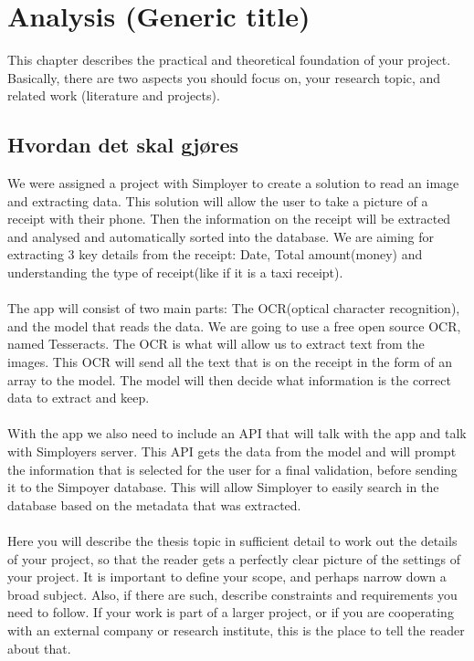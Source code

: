 \cleardoublepage
\chapter{Analysis (Generic title)}
\label{ch:analysis}

This chapter describes the practical and theoretical foundation of your project.
Basically, there are two aspects you should focus on, your research topic, and related work (literature and projects).

\section{Hvordan det skal gjøres}\label{sec:research-topic-(generic-title)}

We were assigned a project with Simployer to create a solution to read an image and extracting data.
This solution will allow the user to take a picture of a receipt with their phone.
Then the information on the receipt will be extracted and analysed and automatically sorted into the database.
We are aiming for extracting 3 key details from the receipt: Date, Total amount(money) and understanding the type of receipt(like if it is a taxi receipt).\\
\\
The app will consist of two main parts: The OCR(optical character recognition), and the model that reads the data.
We are going to use a free open source OCR, named Tesseracts.
The OCR is what will allow us to extract text from the images.
This OCR will send all the text that is on the receipt in the form of an array to the model.
The model will then decide what information is the correct data to extract and keep.\\
\\
With the app we also need to include an API that will talk with the app and talk with Simployers server.
This API gets the data from the model and will prompt the information that is selected for the user for a final validation, before sending it to the Simpoyer database.
This will allow Simployer to easily search in the database based on the metadata that was extracted.\\
\\
Here you will describe the thesis topic in sufficient detail to work out the details of your project, so that the reader gets a perfectly clear picture of the settings of your project.
It is important to define your scope, and perhaps narrow down a broad subject.
Also, if there are such, describe constraints and requirements you need to follow.
If your work is part of a larger project, or if you are cooperating with an external company or research institute, this is the place to tell the reader about that.



